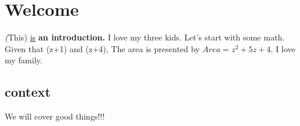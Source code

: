 \documentclass[11pt]{article}
\begin{document}
\section {Welcome}
\textit(This) \underline{is} \textbf{an introduction.} I love my three kids.
Let's start with some math. Given that (z+1) and (z+4),
The area is presented by $Area=z^2+5z+4$.
I love my family.
\subsection[10]{context} We will cover good things!!!
\end{document}
